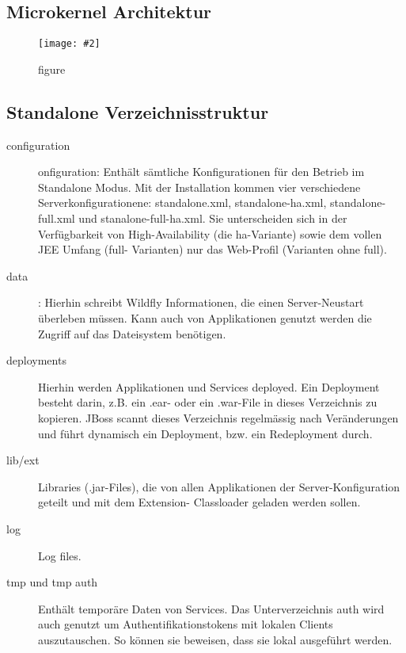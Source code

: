 \documentclass[a4paper,10pt]{scrreprt}
\newcommand{\pic}[2][figure]{\begin{figure}[h]
 \centering
 \texttt{[image: \#2]}
 \caption{#1}
\end{figure}
}
\begin{document}
\subsection{Microkernel Architektur} %
\label{sub:microkernel_architektur}
\pic{mka.png}


\subsection{Standalone Verzeichnisstruktur} %
\label{sub:standalone_verzeichnisstruktir}
\begin{description}
	\item[configuration] onfiguration:
Enthält sämtliche Konfigurationen für den Betrieb im Standalone Modus. Mit der
Installation kommen vier verschiedene Serverkonfigurationene:
standalone.xml, standalone-ha.xml, standalone-full.xml
und stanalone-full-ha.xml. Sie unterscheiden sich in der Verfügbarkeit
von High-Availability (die ha-Variante) sowie dem vollen JEE Umfang (full-
Varianten) nur das Web-Profil (Varianten ohne full).
\item[data] :
Hierhin schreibt Wildfly Informationen, die einen Server-Neustart überleben
müssen. Kann auch von Applikationen genutzt werden die Zugriff auf das
Dateisystem benötigen.
\item[deployments] Hierhin werden Applikationen und Services deployed. Ein Deployment
besteht darin, z.B. ein .ear- oder ein .war-File in dieses Verzeichnis zu kopieren. JBoss scannt dieses
Verzeichnis regelmässig nach Veränderungen und führt dynamisch ein Deployment, bzw. ein Redeployment
durch.
\item[lib/ext] Libraries (.jar-Files), die von allen Applikationen der Server-Konfiguration geteilt und mit dem Extension-
Classloader geladen werden sollen.
\item[log] Log files.
\item[tmp und tmp auth] Enthält temporäre Daten von Services.
Das Unterverzeichnis auth wird auch genutzt um Authentifikationstokens mit lokalen Clients
auszutauschen. So können sie beweisen, dass sie lokal ausgeführt werden.

 
\end{description}

\end{document}
